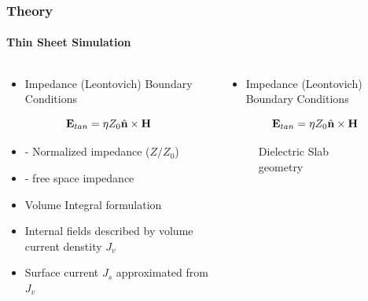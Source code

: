 \documentclass[mathserif,18pt,xcolor=table]{beamer}
\begin{document}
      \begin{frame}
        \frametitle{Theory}
        \framesubtitle{Thin Sheet Simulation}
        \begin{columns}[T] %
          \begin{column}{.5\textwidth}
            \begin{itemize}
              \item{Impedance (Leontovich) Boundary Conditions}
              \end{itemize}
              \begin{equation} \nonumber
                \mathbf{E}_{tan} = \eta Z_0 \hat{\mathbf{n}} \times \mathbf{H}
                \label{eq:eps}
              \end{equation}
              \begin{itemize}
                \item[]{\makebox[.3cm][l]{$\eta$} - Normalized impedance ($Z/Z_0$)}
                \item[]{ - free space impedance}
              \end{itemize}
              \begin{itemize}
              \item{Volume Integral formulation}
              \item{Internal fields described by volume current denstity $J_v$}
              \item{Surface current $J_s$ approximated from $J_v$}
            \end{itemize}
          \end{column}
            \begin{column}[T]{.5\textwidth}
              \begin{itemize}
                \item{Impedance (Leontovich) Boundary Conditions}
                \end{itemize}
                \begin{equation} \nonumber
                  \mathbf{E}_{tan} = \eta Z_0 \hat{\mathbf{n}} \times \mathbf{H}
                  \label{eq:eps}
                \end{equation}
              \begin{figure}
                \def\svgwidth{\linewidth}
                
                \caption{Dielectric Slab geometry}
              \end{figure}
            \end{column}%
          \end{columns}
        \end{frame}
\end{document}
